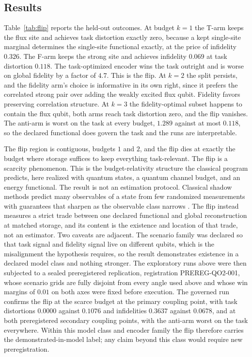 \documentclass[aps,prd,reprint,nofootinbib,longbibliography]{revtex4-2}
\begin{document}
\subsection{Results}

Table~\ref{tab:flip} reports the held-out outcomes.  At budget $k=1$ the
T-arm keeps the flux site and achieves task distortion exactly zero,
because a kept single-site marginal determines the single-site functional
exactly, at the price of infidelity $0.326$.  The F-arm keeps the strong
site and achieves infidelity $0.069$ at task distortion $0.118$.  The
task-optimized encoder wins the task outright and is worse on global
fidelity by a factor of $4.7$.  This is the flip.  At $k=2$ the split
persists, and the fidelity arm's choice is informative in its own right,
since it prefers the correlated strong pair over adding the weakly excited
flux qubit.  Fidelity favors preserving correlation structure.  At $k=3$
the fidelity-optimal subset happens to contain the flux qubit, both arms
reach task distortion zero, and the flip vanishes.  The anti-arm is worst
on the task at every budget, $1.289$ against at most $0.118$, so the
declared functional does govern the task and the runs are interpretable.

The flip region is contiguous, budgets $1$ and $2$, and the flip dies at
exactly the budget where storage suffices to keep everything
task-relevant.  The flip is a scarcity phenomenon.  This is the
budget-relativity structure the classical program predicts, here realized
with quantum states, a quantum channel budget, and an energy functional.
The result is not an estimation protocol.  Classical shadow methods
predict many observables of a state from few randomized measurements with
guarantees that sharpen as the observable class narrows
\cite{Huang2020}.  The flip instead measures a strict trade between one
declared functional and global reconstruction at matched storage, and its
content is the existence and location of that trade, not an estimator.
Two caveats are adjacent.  The scenario family was declared so that task
signal and fidelity signal live on different qubits, which is the
misalignment the hypothesis requires, so the result demonstrates
existence in a declared model class and nothing stronger.  The
exploratory runs above were then subjected to a sealed preregistered
replication, registration PREREG-QO2-001, whose scenario grids are fully
disjoint from every angle used above and whose win margins of $0.01$ on
both axes were fixed before execution.  The governed run confirms the
flip at the scarce budget at the primary coupling point, with task
distortions $0.0000$ against $0.1076$ and infidelities $0.3637$ against
$0.0678$, and at both preregistered secondary coupling points, with the
anti-arm worst on the task everywhere.  Within this model class and
encoder family the flip therefore carries the demonstrated-in-model
label; any claim beyond this class would require new preregistration.
\end{document}
